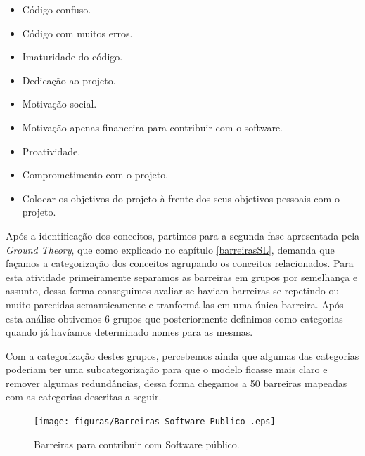 \begin{itemize}
\item Código confuso.
\item Código com muitos erros.
\item Imaturidade do código.
%
\item Dedicação ao projeto.
\item Motivação social.
\item Motivação apenas financeira para contribuir com o software.
\item Proatividade.
\item Comprometimento com o projeto.
\item Colocar os objetivos do projeto à frente dos seus objetivos pessoais com o projeto.
%

\end{itemize}

Após a identificação dos conceitos, partimos para a segunda fase apresentada pela
\textit{Ground Theory}, que como explicado no capítulo \ref{barreirasSL}, demanda que  
façamos a categorização dos conceitos agrupando os conceitos relacionados. Para esta 
atividade primeiramente separamos as barreiras em grupos por semelhança e assunto,
dessa forma conseguimos avaliar se haviam barreiras se repetindo ou muito parecidas
semanticamente e tranformá-las em uma única barreira. Após esta análise obtivemos 6 
grupos que posteriormente definimos como categorias quando já havíamos determinado
nomes para as mesmas. 

Com a categorização destes grupos, percebemos ainda que algumas das categorias
poderiam ter uma subcategorização para que o modelo ficasse mais claro e remover
algumas redundâncias, dessa forma chegamos a 50 barreiras mapeadas com as categorias
descritas a seguir.


\begin{figure}[h]
	\centering
	\label{fig:SPbarreiras}
		\texttt{[image: figuras/Barreiras\_Software\_Publico\_.eps]}
	\caption{Barreiras para contribuir com Software público.}
\end{figure}


